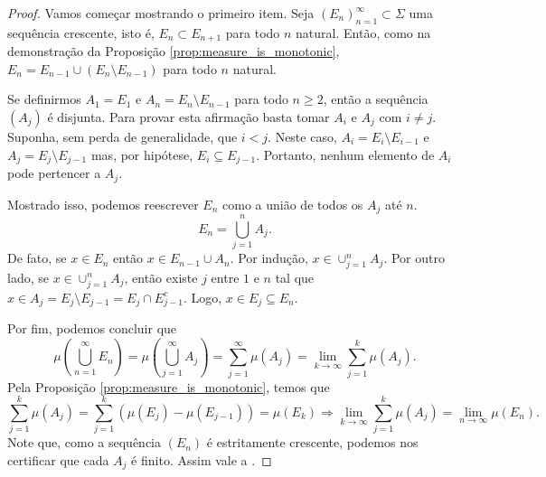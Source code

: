 \begin{proof}
    Vamos começar mostrando o primeiro item. Seja $(E_n)_{n=1}^{\infty}\subset \Sigma$ uma sequência crescente, isto é, $E_n\subset E_{n+1}$ para todo $n$ natural. Então, como na demonstração da Proposição \ref{prop:measure_is_monotonic}, $E_{n}=E_{n-1}\cup (E_{n}\setminus E_{n-1})$ para todo $n$ natural.
    
    Se definirmos $A_1=E_1$ e $A_n=E_{n}\setminus E_{n-1}$ para todo $n\geq 2$, então a sequência $(A_j)$ é disjunta. Para provar esta afirmação basta tomar $A_i$ e $A_j$ com $i\neq j$. Suponha, sem perda de generalidade, que $i < j$. Neste caso, $A_i=E_{i}\setminus E_{i-1}$ e $A_j=E_{j}\setminus E_{j-1}$ mas, por hipótese, $E_i\subseteq E_{j-1}$. Portanto, nenhum elemento de $A_i$ pode pertencer a $A_j$.

    Mostrado isso, podemos reescrever $E_n$ como a união de todos os $A_j$ até $n$.
    \begin{equation*}
        E_n=\bigcup_{j=1}^{n}A_j.
    \end{equation*}
    De fato, se $x\in E_n$ então $x\in E_{n-1} \cup A_n$. Por indução, $x\in\cup_{j=1}^{n}A_j$. Por outro lado, se $x\in \cup_{j=1}^{n}A_j$, então existe $j$ entre $1$ e $n$ tal que $x\in A_j=E_j\setminus E_{j-1}=E_j\cap E_{j-1}^{c}$. Logo, $x\in E_j\subseteq E_n$.

    Por fim, podemos concluir que
    \begin{equation*}
        \mu\left(\bigcup_{n=1}^{\infty} E_n\right)=\mu\left(\bigcup_{j=1}^{\infty} A_j\right)=\sum_{j=1}^{\infty} \mu(A_j)=\lim_{k\rightarrow \infty} \sum_{j=1}^{k} \mu(A_j).
    \end{equation*}
    Pela Proposição \ref{prop:measure_is_monotonic}, temos que
    \begin{equation*}
        \sum_{j=1}^{k} \mu(A_j) = \sum_{j=1}^{k} \left(\mu(E_j)-\mu(E_{j-1})\right) = \mu(E_k)\Longrightarrow \lim_{k\rightarrow \infty} \sum_{j=1}^{k} \mu(A_j)=\lim_{n\rightarrow \infty}\mu(E_n).
    \end{equation*}
    Note que, como a sequência $(E_n)$ é estritamente crescente, podemos nos certificar que cada $A_j$ é finito. Assim vale a .
    
\end{proof}